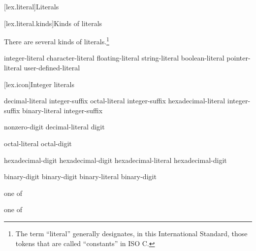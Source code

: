 [lex.literal]{Literals}%

[lex.literal.kinds]{Kinds of literals}

\pnum
{}%
%
There are several kinds of literals.\footnote{The term ``literal'' generally designates, in this
International Standard, those tokens that are called ``constants'' in
ISO C. }

\begin{bnf}
\br
    integer-literal\br
    character-literal\br
    floating-literal\br
    string-literal\br
    boolean-literal\br
    pointer-literal\br
    user-defined-literal
\end{bnf}

[lex.icon]{Integer literals}

%
\begin{bnf}
\br
    decimal-literal integer-suffix\opt\br
    octal-literal integer-suffix\opt\br
    hexadecimal-literal integer-suffix\opt\br
    binary-literal integer-suffix\opt
\end{bnf}

\begin{bnf}
\br
    nonzero-digit\br
    decimal-literal \opt digit
\end{bnf}

\begin{bnf}
\br
    \br
    octal-literal \opt octal-digit
\end{bnf}

\begin{bnf}
\br
     hexadecimal-digit\br
     hexadecimal-digit\br
    hexadecimal-literal \opt hexadecimal-digit
\end{bnf}

\begin{bnf}
\br
     binary-digit\br
     binary-digit\br
    binary-literal \opt binary-digit
\end{bnf}

\begin{bnf}
 \textnormal{one of}\br
\end{bnf}

\begin{bnf}
 \textnormal{one of}\br
\end{bnf}

